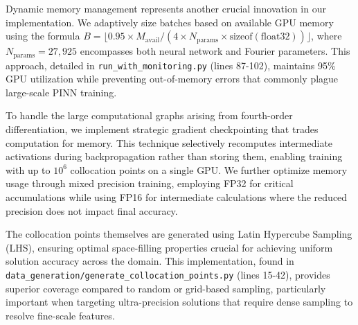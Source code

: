 Dynamic memory management represents another crucial innovation in our implementation. We adaptively size batches based on available GPU memory using the formula $B = \lfloor 0.95 \times M_{\text{avail}} / (4 \times N_{\text{params}} \times \text{sizeof}(\text{float32})) \rfloor$, where $N_{\text{params}} = 27,925$ encompasses both neural network and Fourier parameters. This approach, detailed in \texttt{run\_with\_monitoring.py} (lines 87-102), maintains 95\% GPU utilization while preventing out-of-memory errors that commonly plague large-scale PINN training.

To handle the large computational graphs arising from fourth-order differentiation, we implement strategic gradient checkpointing that trades computation for memory. This technique selectively recomputes intermediate activations during backpropagation rather than storing them, enabling training with up to $10^6$ collocation points on a single GPU. We further optimize memory usage through mixed precision training, employing FP32 for critical accumulations while using FP16 for intermediate calculations where the reduced precision does not impact final accuracy.

The collocation points themselves are generated using Latin Hypercube Sampling (LHS), ensuring optimal space-filling properties crucial for achieving uniform solution accuracy across the domain. This implementation, found in \texttt{data\_generation/generate\_collocation\_points.py} (lines 15-42), provides superior coverage compared to random or grid-based sampling, particularly important when targeting ultra-precision solutions that require dense sampling to resolve fine-scale features.


